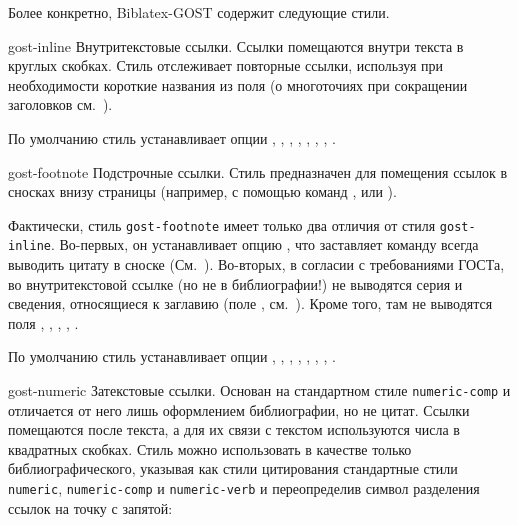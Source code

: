 \documentclass[10pt,a4paper,headings=small,numbers=enddot,english,russian]{ltxdockit}[2011/03/25]
\newcommand*{\biblatex}{Biblatex\xspace}
\newcommand*{\biblatexgost}{\biblatex-GOST\xspace}
\newcommand*{\bibsty}{\texttt}
\renewcommand*{\tabref}{\refs{табл.}{табл.}}
\begin{document}
Более конкретно, \biblatexgost содержит следующие стили.

\begin{marglist}

\item[gost-inline]
Внутритекстовые ссылки. Ссылки помещаются внутри текста в круглых скобках. 
Стиль отслеживает
повторные ссылки, используя при необходимости короткие названия из поля
 (о многоточиях при сокращении заголовков 
см.~).  

По умолчанию стиль устанавливает опции , , 
 , , ,   
, ,
.

\item[gost-footnote]
Подстрочные ссылки.  
Стиль предназначен для помещения ссылок в сносках внизу страницы (например, с помощью 
команд ,  или ).
 
Фактически, стиль \bibsty{gost-footnote} имеет только два отличия от стиля 
\bibsty{gost-inline}. 
Во-первых, он устанавливает опцию , что заставляет команду
 всегда выводить цитату в сноске 
(См.~). Во-вторых, в согласии с требованиями ГОСТа, 
во внутритекстовой ссылке (но не 
в библиографии!) не выводятся серия и сведения, относящиеся 
к заглавию (поле , см.~\tabref{tab:gost-biblatex}). Кроме того,
там не выводятся поля , 
, , , . 

По умолчанию стиль устанавливает опции , , 
, , ,   
, ,
.

\item[gost-numeric]
Затекстовые ссылки. Основан на стандартном стиле \bibsty{numeric-comp} и отличается 
от него лишь оформлением библиографии, но не цитат. Ссылки помещаются после текста, 
а для их связи с текстом используются числа в квадратных скобках. Стиль можно использовать 
в качестве только 
библиографического, указывая как стили цитирования стандартные стили \bibsty{numeric}, 
\bibsty{numeric-comp} и \bibsty{numeric-verb} и переопределив символ разделения ссылок на
точку с запятой:


\end{marglist}
\end{document}
